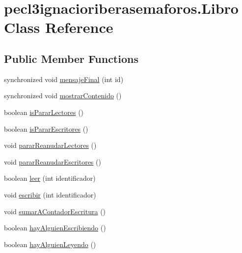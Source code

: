 \hypertarget{classpecl3ignacioriberasemaforos_1_1_libro}{}\section{pecl3ignacioriberasemaforos.\+Libro Class Reference}
\label{classpecl3ignacioriberasemaforos_1_1_libro}
\subsection*{Public Member Functions}
\begin{DoxyCompactItemize}
\item 
synchronized void \mbox{\hyperlink{classpecl3ignacioriberasemaforos_1_1_libro_ae829764ad31e50fb4431320afae79035}{mensaje\+Final}} (int id)
\item 
synchronized void \mbox{\hyperlink{classpecl3ignacioriberasemaforos_1_1_libro_adf6ca4b4723c810075def5c4c6f4a07c}{mostrar\+Contenido}} ()
\item 
boolean \mbox{\hyperlink{classpecl3ignacioriberasemaforos_1_1_libro_af6178cea680fdd2f3a42bbc477cf3a51}{is\+Parar\+Lectores}} ()
\item 
boolean \mbox{\hyperlink{classpecl3ignacioriberasemaforos_1_1_libro_aa68c7f9315d2c2f07ac549f13b1525bc}{is\+Parar\+Escritores}} ()
\item 
void \mbox{\hyperlink{classpecl3ignacioriberasemaforos_1_1_libro_afd336fcdff8177ebfcebbc68a7333fde}{parar\+Reanudar\+Lectores}} ()
\item 
void \mbox{\hyperlink{classpecl3ignacioriberasemaforos_1_1_libro_a73e931357770752d63a701195a996f09}{parar\+Reanudar\+Escritores}} ()
\item 
boolean \mbox{\hyperlink{classpecl3ignacioriberasemaforos_1_1_libro_a0c0063019147f6501b2216621ee020ce}{leer}} (int identificador)
\item 
void \mbox{\hyperlink{classpecl3ignacioriberasemaforos_1_1_libro_a8077242f921bac18bb1205ae15356d95}{escribir}} (int identificador)
\item 
void \mbox{\hyperlink{classpecl3ignacioriberasemaforos_1_1_libro_a21c76550518b5fd6a966cd4dc6522fff}{sumar\+A\+Contador\+Escritura}} ()
\item 
boolean \mbox{\hyperlink{classpecl3ignacioriberasemaforos_1_1_libro_aa0884cf350ca7e0e03ffc681d7404ab8}{hay\+Alguien\+Escribiendo}} ()
\item 
boolean \mbox{\hyperlink{classpecl3ignacioriberasemaforos_1_1_libro_ac67a7afbfa38fb566526bfa7f688beaa}{hay\+Alguien\+Leyendo}} ()

\end{DoxyCompactItemize}
